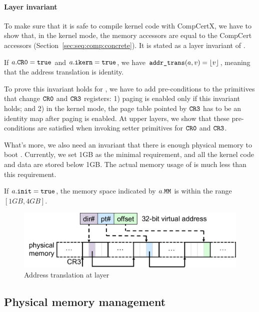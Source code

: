 \paragraph{Layer invariant}
To make sure that it is safe to compile
kernel code with CompCertX,
we have to show that, in the kernel mode,
the memory accessors are equal to the CompCert accessors
(\cf Section~\ref{sec:seq:comp:concrete}).
It is stated as a layer invariant of .
\begin{invariant}
If $a.{\texttt{CR0}} = {\texttt{true}}$
and $a.{\texttt{ikern}} = {\texttt{true}}$,
we have ${\texttt{addr\_trans}}(a,v) = \left\lfloor {v} \right\rfloor$,
 meaning that the address translation is identity.
\end{invariant}

To prove this invariant holds for ,
we have to add pre-conditions
to the primitives that change ${\texttt{CR0}}$ and ${\texttt{CR3}}$
registers:
1) paging is enabled only if this invariant
holds;
and 2) in the kernel mode,
the page table pointed by ${\texttt{CR3}}$
has to be an identity map
after paging is enabled.
At upper layers,
we  show that
these pre-conditions
are satisfied
when invoking setter primitives for ${\texttt{CR0}}$ and ${\texttt{CR3}}$.

What's more,
we also need an invariant that there is enough
physical memory to boot \mCTOS{}.
Currently, we set 1GB as the minimal requirement,
and all the kernel code and data are stored below
1GB. The actual memory usage of \mCTOS{}
is much less than this requirement.
\begin{invariant}
If $a.{\texttt{init}} = {\texttt{true}}$,
the memory space indicated by $a.{\texttt{MM}}$
is within the range
$[1GB, 4GB]$.
\end{invariant}

\begin{figure}[t]\centering
\includegraphics[scale=.55]{figs/mem_model_1} 
\caption{Address translation at  layer}
\label{fig:seq:mem1}
\hrulefill
\end{figure}




\subsection{Physical memory management}
\label{sec:base:pmm} 

